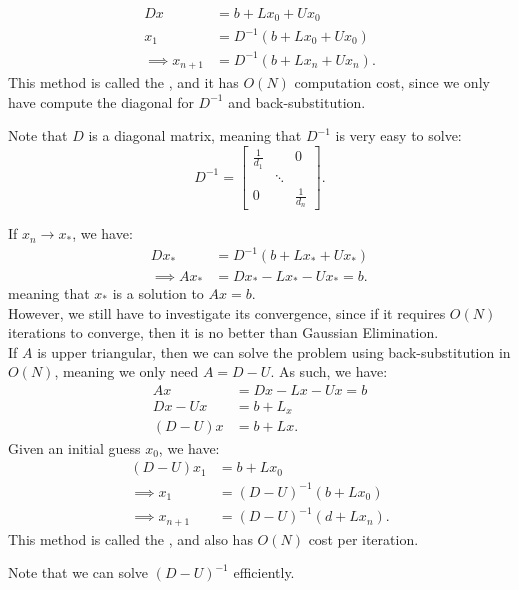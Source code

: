 \documentclass[../main/main.tex]{subfiles}
\begin{document}
\begin{align*} 
Dx &=  b + Lx_0 + Ux_0 \\
x_1 &= D^{-1}(b + Lx_0 + Ux_0) \\
\implies x_{n+1} &= D^{-1} (b+Lx_n + Ux_n)
.\end{align*}
This method is called the , and it has $O(N)$ computation cost, since we only have compute the diagonal for $D^{-1}$ and back-substitution.  
\begin{remark}
Note that $D$ is a diagonal matrix, meaning that  $D^{-1}$ is very easy to solve: \[
    D^{-1} = 
\begin{bmatrix} \frac{1}{d_1} &  & 0\\ & \ddots & \\ 0 & & \frac{1}{d_n} \end{bmatrix}
.\] 
\end{remark}
If $x_n \to  x_{*}$, we have: 
\begin{align*}
    D x_{*} &= D^{-1} (b+Lx_{*} + Ux_*) \\
    \implies Ax_{*} &= Dx_{*} - Lx_* - Ux_* = b
.\end{align*} meaning that $x_{*}$ is a solution to $Ax = b$.\\

However, we still have to investigate its convergence, since if it requires $O(N)$ iterations to converge, then it is no better than Gaussian Elimination. \\

If $A$ is upper triangular, then we can solve the problem using back-substitution in $O(N)$, meaning we only need $A = D-U$. As such, we have:
\begin{align*}
    Ax &= Dx - Lx - Ux = b \\
    Dx - Ux &= b + L_x \\
    (D-U)x &= b + Lx
.\end{align*}
Given an initial guess $x_0$, we have: 
\begin{align*} 
    (D-U) x_1 &= b + Lx_0 \\
    \implies x_1 &= (D-U)^{-1} (b+Lx_0) \\
    \implies x_{n+1} &= (D-U)^{-1} (d+L{x_n})
.\end{align*}
This method is called the , and also has $O(N)$ cost per iteration.
\begin{remark}
    Note that we can solve $(D-U)^{-1}$ efficiently.
\end{remark}
\end{document}
